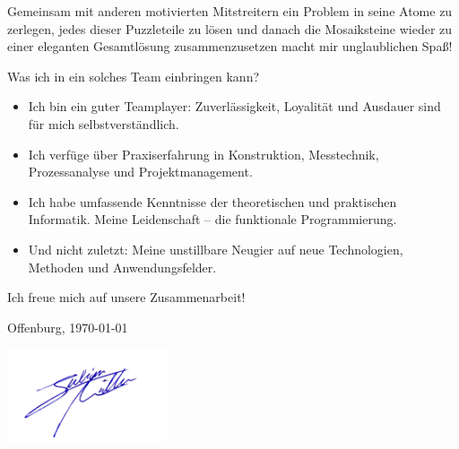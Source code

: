 \documentclass[noindent]{scrartcl}
\begin{document}
\thispagestyle{empty}

\begin{minipage}{\textwidth}
\vspace{4cm}
\end{minipage}

\noindent\spacedlowsmallcaps{\huge \textcolor{blaze}{Ich liebe es Probleme zu lösen!}}
\large
\vspace{0.5em}

\noindent Gemeinsam mit anderen motivierten Mitstreitern
ein Problem in seine Atome zu zerlegen, jedes dieser Puzzleteile
zu lösen und danach die Mosaiksteine wieder zu einer eleganten Gesamtlösung 
zusammenzusetzen macht mir unglaublichen Spa\ss!\vspace{0.5em}


\noindent {}Was ich in ein solches Team einbringen kann?
\begin{itemize}
\item {}
    Ich bin ein guter Teamplayer: Zuverlässigkeit, Loyalität und 
    Ausdauer sind für mich selbstverständlich.
\item {} 
    Ich verfüge über Praxiserfahrung in Konstruktion, Messtechnik, Prozessanalyse und Projektmanagement.
\item {}
    Ich habe umfassende Kenntnisse der theoretischen und praktischen Informatik. 
    Meine Leidenschaft -- die funktionale Programmierung.
\item {} 
    Und nicht zuletzt: Meine unstillbare Neugier auf neue Technologien, Methoden
    und Anwendungsfelder.
\end{itemize}
\noindent Ich freue mich auf unsere Zusammenarbeit!\newline

\noindent Offenburg, \today

\begin{minipage}{\textwidth}
\vspace{0.5em}
\hspace{-1em}\includegraphics[width=4.7cm]{sig}
\end{minipage}
\end{document}
